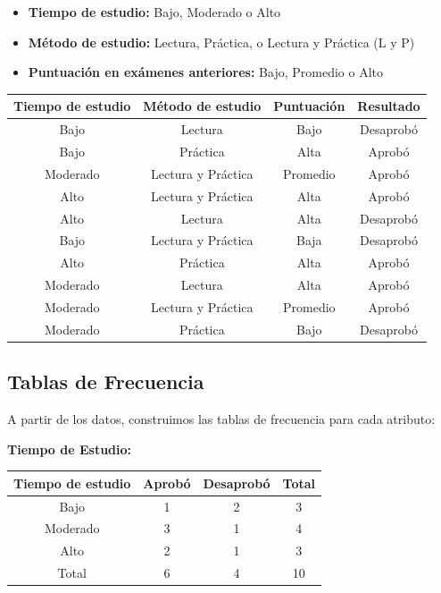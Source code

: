\documentclass[12pt]{article}
\begin{document}
\begin{itemize}
    \item \textbf{Tiempo de estudio:} Bajo, Moderado o Alto
    \item \textbf{Método de estudio:} Lectura, Práctica, o Lectura y Práctica (L y P)
    \item \textbf{Puntuación en exámenes anteriores:} Bajo, Promedio o Alto
\end{itemize}

\begin{table}[H]
    \centering
    \begin{tabular}{cccc}
        \toprule
        Tiempo de estudio & Método de estudio & Puntuación & Resultado \\
        \midrule
        Bajo & Lectura & Bajo & Desaprobó \\
        Bajo & Práctica & Alta & Aprobó \\
        Moderado & Lectura y Práctica & Promedio & Aprobó \\
        Alto & Lectura y Práctica & Alta & Aprobó \\
        Alto & Lectura & Alta & Desaprobó \\
        Bajo & Lectura y Práctica & Baja & Desaprobó \\
        Alto & Práctica & Alta & Aprobó \\
        Moderado & Lectura & Alta & Aprobó \\
        Moderado & Lectura y Práctica & Promedio & Aprobó \\
        Moderado & Práctica & Bajo & Desaprobó \\
        \bottomrule
    \end{tabular}
\end{table}

\subsection{Tablas de Frecuencia}
A partir de los datos, construimos las tablas de frecuencia para cada atributo:

\vspace{1em}

\textbf{Tiempo de Estudio:}
\begin{table}[H]
    \centering
    \begin{tabular}{cccc}
        \toprule
        Tiempo de estudio & Aprobó & Desaprobó & Total \\
        \midrule
        Bajo & 1 & 2 & 3 \\
        Moderado & 3 & 1 & 4 \\
        Alto & 2 & 1 & 3 \\
        \midrule
        Total & 6 & 4 & 10 \\
        \bottomrule
    \end{tabular}
\end{table}
\end{document}

